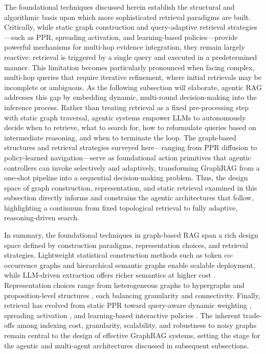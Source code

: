 \documentclass[11pt]{article}
\begin{document}
The foundational techniques discussed herein establish the structural and algorithmic basis upon which more sophisticated retrieval paradigms are built. Critically, while static graph construction and query-adaptive retrieval strategies---such as PPR, spreading activation, and learning-based policies---provide powerful mechanisms for multi-hop evidence integration, they remain largely reactive: retrieval is triggered by a single query and executed in a predetermined manner. This limitation becomes particularly pronounced when facing complex, multi-hop queries that require iterative refinement, where initial retrievals may be incomplete or ambiguous. As the following subsection will elaborate, agentic RAG addresses this gap by embedding dynamic, multi-round decision-making into the inference process. Rather than treating retrieval as a fixed pre-processing step with static graph traversal, agentic systems empower LLMs to autonomously decide when to retrieve, what to search for, how to reformulate queries based on intermediate reasoning, and when to terminate the loop. The graph-based structures and retrieval strategies surveyed here---ranging from PPR diffusion to policy-learned navigation---serve as foundational action primitives that agentic controllers can invoke selectively and adaptively, transforming GraphRAG from a one-shot pipeline into a sequential decision-making problem. Thus, the design space of graph construction, representation, and static retrieval examined in this subsection directly informs and constrains the agentic architectures that follow, highlighting a continuum from fixed topological retrieval to fully adaptive, reasoning-driven search.

In summary, the foundational techniques in graph-based RAG span a rich design space defined by construction paradigms, representation choices, and retrieval strategies. Lightweight statistical construction methods such as token co-occurrence graphs \cite{ref284} and hierarchical semantic graphs \cite{ref285} enable scalable deployment, while LLM-driven extraction offers richer semantics at higher cost \cite{ref288}. Representation choices range from heterogeneous graphs to hypergraphs \cite{ref303} and proposition-level structures \cite{ref294}, each balancing granularity and connectivity. Finally, retrieval has evolved from static PPR toward query-aware dynamic weighting \cite{ref304}, spreading activation \cite{ref298}, and learning-based interactive policies \cite{ref301}. The inherent trade-offs among indexing cost, granularity, scalability, and robustness to noisy graphs remain central to the design of effective GraphRAG systems, setting the stage for the agentic and multi-agent architectures discussed in subsequent subsections.
\end{document}
